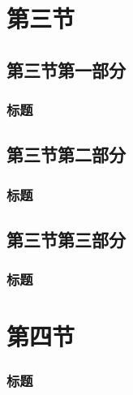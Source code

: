 \documentclass[xetex,mathserif,serif,handout]{beamer}
\begin{document}
	\section{第三节}
	\subsection{第三节第一部分}
	\begin{frame}
		\frametitle{标题}
	\end{frame}
	\subsection{第三节第二部分}
	\begin{frame}
		\frametitle{标题}
	\end{frame}
	\subsection{第三节第三部分}
	\begin{frame}
		\frametitle{标题}
	\end{frame}

	\section{第四节}
	\begin{frame}
		\frametitle{标题}
	\end{frame}

	\begin{frame}
		\thanks
	\end{frame}
\end{document}

